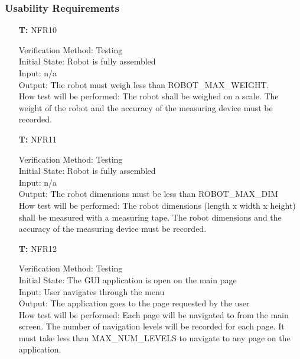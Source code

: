 \documentclass[12pt, titlepage]{article}
\newcounter{tnum} %
\begin{document}
\subsubsection{Usability Requirements}

\begin{itemize}
				
\item[\textbf{T\refstepcounter{tnum}\thetnum:}]{NFR10\\}

Verification Method: Testing	\\				
Initial State: Robot is fully assembled	\\			
Input: n/a\\
Output: The robot must weigh less than ROBOT\_MAX\_WEIGHT.\\
How test will be performed: The robot shall be weighed on a scale. The weight of the robot and the accuracy of the measuring device must be recorded.\\

\item[\textbf{T\refstepcounter{tnum}\thetnum:}]{NFR11\\}

Verification Method: Testing\\					
Initial State: Robot is fully assembled	\\			
Input: n/a\\
Output: The robot dimensions must be less than ROBOT\_MAX\_DIM \\
How test will be performed: The robot dimensions (length x width x height) shall be measured with a measuring tape. The robot dimensions and the accuracy of the measuring device must be recorded.\\

\item[\textbf{T\refstepcounter{tnum}\thetnum:}]{NFR12\\}

Verification Method: Testing\\					
Initial State: The GUI application is open on the main page\\			
Input: User navigates through the menu\\
Output: The application goes to the page requested by the user\\
How test will be performed: Each page will be navigated to from the main screen. The number of navigation levels will be recorded for each page. It must take less than MAX\_NUM\_LEVELS to navigate to any page on the application.\\


\end{itemize}
\end{document}
